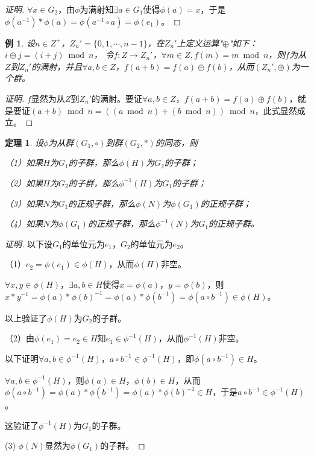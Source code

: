 \documentclass{article}
\newtheorem{Thm}{定理}
\newtheorem*{Example}{例}
\begin{document}
\begin{CJK*}{UTF8}{gbsn}
\begin{proof}[证明]
  $\forall x\in G_2$，由$\phi$为满射知$\exists a\in G_1$使得$\phi(a)=x$，于是$\phi(a^{-1})*\phi(a)=\phi(a^{-1}\circ a)=\phi(e_1)$。
\end{proof}

\begin{Example}
  设$n\in Z^+$，$Z_n'=\{0,1,\cdots, n-1\}$，在$Z_n'$上定义运算"$\oplus$"如下：$i\oplus j=(i+j)\bmod n$，
  令$f:Z\to Z_n'$，$\forall m\in Z, f(m)= m \bmod n$，则$f$为从$Z$到$Z_n'$的满射，并且$\forall a,b\in Z$，$f(a+b)=f(a)\oplus f(b)$，从而$(Z_n',\oplus)$为一个群。
\end{Example}
\begin{proof}[证明]
  $f$显然为从$Z$到$Z_n'$的满射。要证$\forall a,b\in Z$，$f(a+b)=f(a)\oplus f(b)$，就是要证$(a+b)\bmod n = ((a\bmod n) + (b\bmod n))\bmod n$，此式显然成立。
\end{proof}
\begin{Thm}
  设$\phi$为从群$(G_1,\circ)$到群$(G_2,*)$的同态，则

  （1）如果$H$为$G_1$的子群，那么$\phi(H)$为$G_2$的子群；

  （2）如果$H$为$G_2$的子群，那么$\phi^{-1}(H)$为$G_1$的子群；

  （3）如果$N$为$G_1$的正规子群，那么$\phi(N)$为$\phi(G_1)$的正规子群；

  （4）如果$N$为$\phi(G_1)$的正规子群，那么$\phi^{-1}(N)$为$G_1$的正规子群。
\end{Thm}
\begin{proof}[证明]
  以下设$G_1$的单位元为$e_1$，$G_2$的单位元为$e_2$。

  （1）$e_2=\phi(e_1)\in \phi(H)$，从而$\phi(H)$非空。

  $\forall x, y\in \phi(H)$，$\exists a,b\in H$使得$x=\phi(a)$，$y=\phi(b)$，则$x*y^{-1}=\phi(a)*\phi(b)^{-1}=\phi(a)*\phi(b^{-1})=\phi(a\circ b^{-1})\in \phi(H)$。

  以上验证了$\phi(H)$为$G_2$的子群。

  （2）由$\phi(e_1)=e_2\in H$知$e_1\in \phi^{-1}(H)$，从而$\phi^{-1}(H)$非空。

  以下证明$\forall a,b\in \phi^{-1}(H)$，$a\circ b^{-1}\in \phi^{-1}(H)$，即$\phi(a\circ b^{-1})\in H$。
  
  $\forall a,b\in \phi^{-1}(H)$，则$\phi(a)\in H$，$\phi(b)\in H$，从而$\phi(a\circ b^{-1})=\phi(a)*\phi(b^{-1})=\phi(a)*\phi(b)^{-1}\in H$，于是$a\circ b^{-1}\in \phi^{-1}(H)$。

  这验证了$\phi^{-1}(H)$为$G_1$的子群。

  (3) $\phi(N)$显然为$\phi(G_1)$的子群。


\end{proof}
\end{CJK*}
\end{document}
